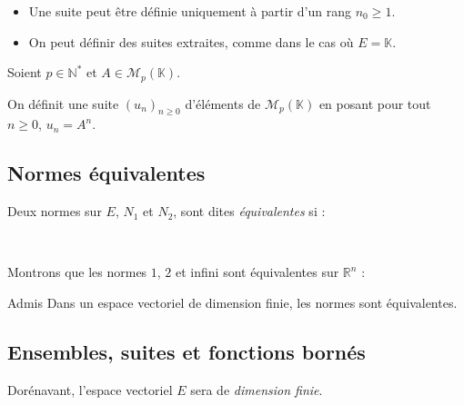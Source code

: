 \documentclass[french,11pt,twoside]{VcCours}
\begin{document}
\begin{Remarques}{}
\begin{itemize} 
\item Une suite peut être définie uniquement à partir d'un rang $n_0 \geq 1$.
\item On peut définir des suites extraites, comme dans le cas où $E = \mathbb{K}$.
\end{itemize}
\end{Remarques}{}

\medskip

\begin{Exemple} 
    Soient $p \in \mathbb{N}^{*}$ et $A \in \mathcal{M}_p(\mathbb{K})$. 
    
    On définit une suite $(u_n)_{n \geq 0}$ d'éléments de $\mathcal{M}_p(\mathbb{K})$ en posant pour tout $n \geq 0$, $u_n = A^n$. 
\end{Exemple}

\subsection{Normes équivalentes}

\begin{Definition}{}
    Deux normes sur $E$, $N_1$ et $N_2$, 
    sont dites \emph{équivalentes} si :

\vspace*{1cm}~
\end{Definition}

\begin{Exemple} Montrons que les normes $1$, $2$ et infini sont équivalentes sur $\mathbb{R}^n$ :

\newpage

\vspace*{3cm}
\end{Exemple}

\begin{Theoreme}{Admis} Dans un espace vectoriel de dimension finie, les normes sont équivalentes.
\end{Theoreme}

\subsection{Ensembles, suites et fonctions bornés}

Dorénavant, l'espace vectoriel $E$ sera de \emph{dimension finie}.
\end{document}
